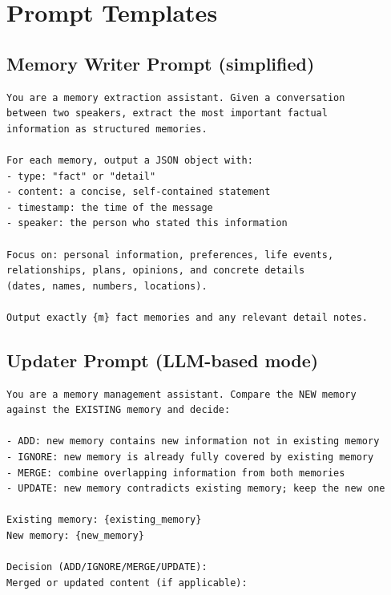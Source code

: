 \documentclass[11pt]{article}
\begin{document}


\clearpage
\onecolumn
\appendix

\section{Prompt Templates}

\subsection{Memory Writer Prompt (simplified)}
{\footnotesize
\begin{verbatim}
You are a memory extraction assistant. Given a conversation
between two speakers, extract the most important factual
information as structured memories.

For each memory, output a JSON object with:
- type: "fact" or "detail"
- content: a concise, self-contained statement
- timestamp: the time of the message
- speaker: the person who stated this information

Focus on: personal information, preferences, life events,
relationships, plans, opinions, and concrete details
(dates, names, numbers, locations).

Output exactly {m} fact memories and any relevant detail notes.
\end{verbatim}
}

\subsection{Updater Prompt (LLM-based mode)}
{\footnotesize
\begin{verbatim}
You are a memory management assistant. Compare the NEW memory
against the EXISTING memory and decide:

- ADD: new memory contains new information not in existing memory
- IGNORE: new memory is already fully covered by existing memory
- MERGE: combine overlapping information from both memories
- UPDATE: new memory contradicts existing memory; keep the new one

Existing memory: {existing_memory}
New memory: {new_memory}

Decision (ADD/IGNORE/MERGE/UPDATE):
Merged or updated content (if applicable):
\end{verbatim}
}
\end{document}
